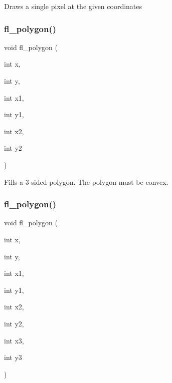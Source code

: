 Draws a single pixel at the given coordinates \mbox{\label{group__fl__drawings_ga821e9db88f1ff6a8d348c80babd7b49c}} 
\subsubsection{\texorpdfstring{fl\+\_\+polygon()}{fl\_polygon()}\hspace{0.1cm}{\footnotesize\ttfamily [1/2]}}
{\footnotesize\ttfamily void fl\+\_\+polygon (\begin{DoxyParamCaption}\item[{int}]{x,  }\item[{int}]{y,  }\item[{int}]{x1,  }\item[{int}]{y1,  }\item[{int}]{x2,  }\item[{int}]{y2 }\end{DoxyParamCaption})\hspace{0.3cm}{\ttfamily [inline]}}

Fills a 3-\/sided polygon. The polygon must be convex. \mbox{\label{group__fl__drawings_gab14ee2f4c5371ab6fe52bf08569e05d9}} 
\subsubsection{\texorpdfstring{fl\+\_\+polygon()}{fl\_polygon()}\hspace{0.1cm}{\footnotesize\ttfamily [2/2]}}
{\footnotesize\ttfamily void fl\+\_\+polygon (\begin{DoxyParamCaption}\item[{int}]{x,  }\item[{int}]{y,  }\item[{int}]{x1,  }\item[{int}]{y1,  }\item[{int}]{x2,  }\item[{int}]{y2,  }\item[{int}]{x3,  }\item[{int}]{y3 }\end{DoxyParamCaption})\hspace{0.3cm}{\ttfamily [inline]}}

